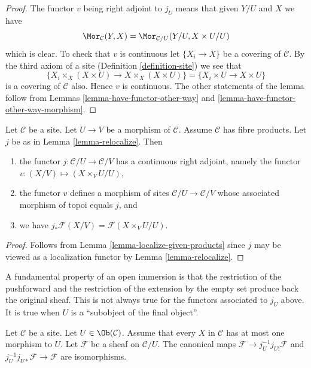 \begin{proof}
The functor $v$ being right adjoint to $j_U$ means that given $Y/U$ and $X$
we have
$$
\Mor_\mathcal{C}(Y, X)
=
\Mor_{\mathcal{C}/U}(Y/U, X \times U/U)
$$
which is clear. To check that $v$ is continuous let $\{X_i \to X\}$ be
a covering of $\mathcal{C}$. By the third axiom of a site
(Definition \ref{definition-site})
we see that
$$
\{X_i \times_X (X \times U) \to X \times_X (X \times U)\}
=
\{X_i \times U \to X \times U\}
$$
is a covering of $\mathcal{C}$ also. Hence $v$ is continuous. The other
statements of the lemma follow from Lemmas \ref{lemma-have-functor-other-way}
and \ref{lemma-have-functor-other-way-morphism}.
\end{proof}

\begin{lemma}
\label{lemma-relocalize-given-fibre-products}
Let $\mathcal{C}$ be a site. Let $U \to V$ be a morphism of $\mathcal{C}$.
Assume $\mathcal{C}$ has fibre products. Let $j$ be as in
Lemma \ref{lemma-relocalize}. Then
\begin{enumerate}
\item the functor $j : \mathcal{C}/U \to \mathcal{C}/V$
has a continuous right adjoint, namely the functor
$v : (X/V) \mapsto (X \times_V U/U)$,
\item the functor $v$ defines a morphism of sites
$\mathcal{C}/U \to \mathcal{C}/V$ whose associated morphism of topoi equals
$j$, and
\item we have $j_*\mathcal{F}(X/V) = \mathcal{F}(X \times_V U/U)$.
\end{enumerate}
\end{lemma}

\begin{proof}
Follows from Lemma \ref{lemma-localize-given-products} since $j$ may be viewed
as a localization functor by Lemma \ref{lemma-relocalize}.
\end{proof}

\noindent
A fundamental property of an open immersion is
that the restriction of the pushforward and the restriction
of the extension by the empty set produce back the original sheaf.
This is not always true for the functors associated to $j_U$
above. It is true when $U$ is a ``subobject of the final object''.

\begin{lemma}
\label{lemma-restrict-back}
Let $\mathcal{C}$ be a site.
Let $U \in \Ob(\mathcal{C})$.
Assume that every $X$ in $\mathcal{C}$ has at most
one morphism to $U$. Let $\mathcal{F}$ be a sheaf on $\mathcal{C}/U$.
The canonical maps $\mathcal{F} \to j_U^{-1}j_{U!}\mathcal{F}$
and $j_U^{-1}j_{U*}\mathcal{F} \to \mathcal{F}$ are
isomorphisms.
\end{lemma}

